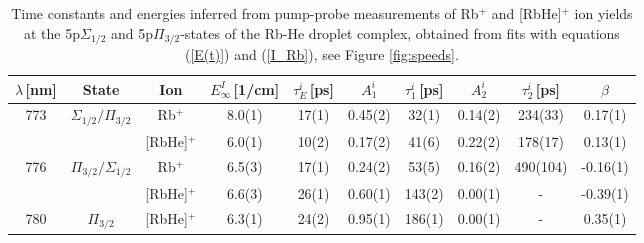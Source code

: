 
\begin{table}[t]
	\begin{center}
		\begin{tabular}{| c c | c | c c | c c c c| c |}
			\hline
			$\lambda$\,[nm] & State & Ion & $E_\infty^I$\,[1/cm] & $\tau^i_E$\,[ps] & $A^i_1$ & $\tau^i_1$\,[ps] & $A^i_2$ & $\tau^i_2$\,[ps] & $\beta$ \\  
			\hline\hline
			773 & $\Sigma_{1/2}/\Pi_{3/2}$ 	& Rb$^+$ & 8.0(1) & 17(1) & 0.45(2) & 32(1) & 0.14(2) & 234(33) & 0.17(1) \\
				& 							& [RbHe]$^+$ & 6.0(1) & 10(2) & 0.17(2) & 41(6) & 0.22(2) & 178(17) & 0.13(1) \\
			\hline
			776 & $\Pi_{3/2}/\Sigma_{1/2}$ & Rb$^+$ & 6.5(3) & 17(1) & 0.24(2) & 53(5) & 0.16(2) & 490(104) & -0.16(1) \\
			 &  & [RbHe]$^+$ & 6.6(3) & 26(1) & 0.60(1) & 143(2) & 0.00(1) & - & -0.39(1)  \\
			\hline
						780 & $\Pi_{3/2}$ &  [RbHe]$^+$ & 6.3(1) & 24(2) & 0.95(1) & 186(1) & 0.00(1) & - & 0.35(1) \\
			\hline
		\end{tabular}
		\caption{Time constants and energies inferred from pump-probe measurements of Rb$^+$ and [RbHe]$^+$ ion yields at the 5p$\Sigma_{1/2}$ and 5p$\Pi_{3/2}$-states of the Rb-He droplet complex, obtained from fits with equations (\ref{E(t)}) and (\ref{I_Rb}), see Figure \ref{fig:speeds}.
		\label{tab:FitParsIons}}
	\end{center}
\end{table}
